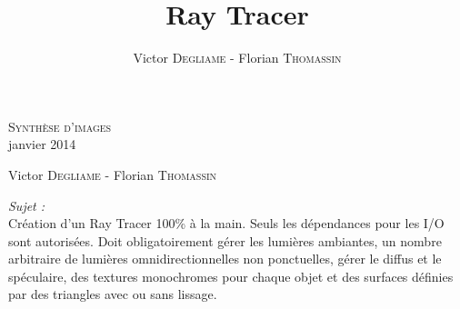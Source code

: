 \documentclass[fontsize=10pt, twoside=no]{scrartcl} %
\begin{document}
\begin{titlepage}
\pagestyle{headings}


\begin{center}

\thispagestyle{empty}

\vspace*{5\baselineskip}

\textsc{\Large Synthèse d'images}\\[0.2cm]
janvier 2014\\[0.5cm]

\vspace*{2\baselineskip}

\begin{minipage}[t]{.8\textwidth}
  \begin{flushleft} \large
    Victor \textsc{Degliame} -
    Florian \textsc{Thomassin}
  \end{flushleft}
\end{minipage}

\vspace*{5\baselineskip}

\begin{minipage}[t]{0.8\textwidth}
  \noindent
  \emph{Sujet :}\\
  Création d'un Ray Tracer 100\% à la main. Seuls les dépendances pour les I/O sont autorisées. Doit obligatoirement
  gérer les lumières ambiantes, un nombre arbitraire de lumières omnidirectionnelles non ponctuelles, gérer le diffus et
  le spéculaire, des textures monochromes pour chaque objet et des surfaces définies par des triangles avec ou sans
  lissage.
\end{minipage}


\end{center}

\end{titlepage}


\title{Ray Tracer}
\author{Victor \textsc{Degliame} - Florian \textsc{Thomassin}}
\end{document}
